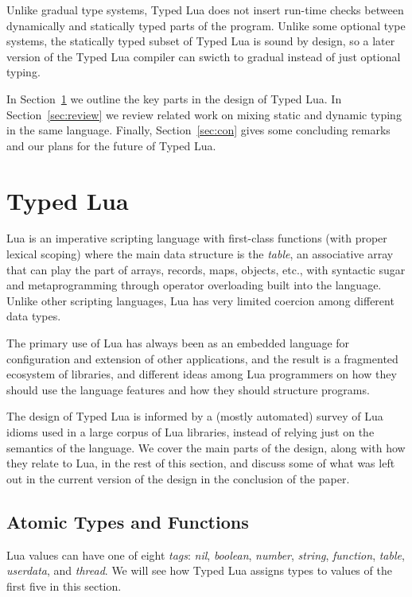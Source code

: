 \documentclass[preprint]{sig-alternate}
\begin{document}
Unlike gradual type systems, Typed Lua does not insert run-time
checks between dynamically and statically typed parts of the program.
Unlike some optional type systems, the statically typed subset of
Typed Lua is sound by design, so a later version of the Typed Lua
compiler can swicth to gradual instead of just optional typing.

In Section~\ref{sec:proposal} we outline the key parts in
the design of Typed Lua. In Section~\ref{sec:review} we review
related work on mixing static and dynamic typing in the same language.
Finally, Section~\ref{sec:con} gives some concluding remarks and
our plans for the future of Typed Lua.

\section{Typed Lua} \label{sec:proposal}

Lua is an imperative scripting language with first-class functions
(with proper lexical scoping) where the main data structure is the
{\em table}, an associative array that can play the part of arrays,
records, maps, objects, etc., with syntactic sugar and
metaprogramming through operator overloading built into
the language. Unlike other scripting languages, Lua has very
limited coercion among different data types.

The primary use of Lua has always been as an embedded language
for configuration and extension of other applications, and the result
is a fragmented ecosystem of libraries, and different ideas among
Lua programmers on how they should use the language features and
how they should structure programs.

The design of Typed Lua is informed by a (mostly automated) survey
of Lua idioms used in a large corpus of Lua libraries, instead of
relying just on the semantics of the language. We cover the main parts
of the design, along with how they relate to Lua, in the rest of this section,
and discuss some of what was left out in the current version of the design
in the conclusion of the paper.

\subsection{Atomic Types and Functions}

Lua values can have one of eight {\em tags}: {\em nil}, {\em boolean},
{\em number}, {\em string}, {\em function}, {\em table}, {\em userdata},
and {\em thread}. We will see how Typed Lua assigns types to
values of the first five in this section.
\end{document}
